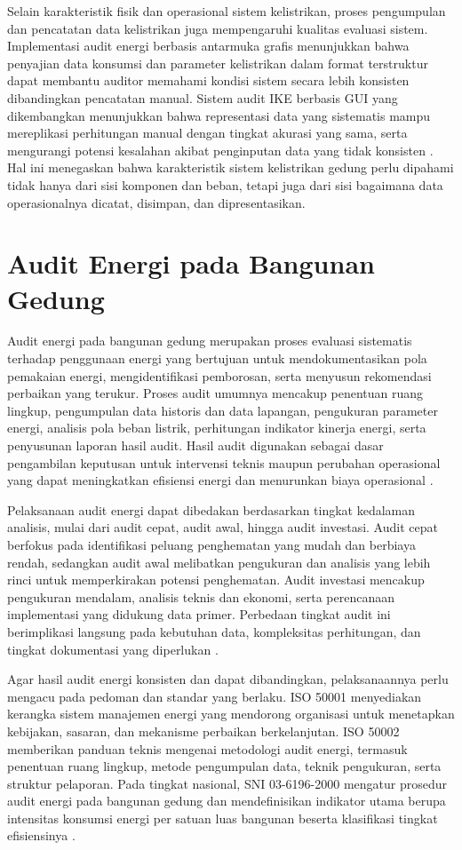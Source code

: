 Selain karakteristik fisik dan operasional sistem kelistrikan, proses pengumpulan dan pencatatan data kelistrikan juga mempengaruhi kualitas evaluasi sistem. Implementasi audit energi berbasis antarmuka grafis menunjukkan bahwa penyajian data konsumsi dan parameter kelistrikan dalam format terstruktur dapat membantu auditor memahami kondisi sistem secara lebih konsisten dibandingkan pencatatan manual. Sistem audit IKE berbasis GUI yang dikembangkan menunjukkan bahwa representasi data yang sistematis mampu mereplikasi perhitungan manual dengan tingkat akurasi yang sama, serta mengurangi potensi kesalahan akibat penginputan data yang tidak konsisten \cite{fitri2022sistem}. Hal ini menegaskan bahwa karakteristik sistem kelistrikan gedung perlu dipahami tidak hanya dari sisi komponen dan beban, tetapi juga dari sisi bagaimana data operasionalnya dicatat, disimpan, dan dipresentasikan.

\section{Audit Energi pada Bangunan Gedung}
Audit energi pada bangunan gedung merupakan proses evaluasi sistematis terhadap penggunaan energi yang bertujuan untuk mendokumentasikan pola pemakaian energi, mengidentifikasi pemborosan, serta menyusun rekomendasi perbaikan yang terukur. Proses audit umumnya mencakup penentuan ruang lingkup, pengumpulan data historis dan data lapangan, pengukuran parameter energi, analisis pola beban listrik, perhitungan indikator kinerja energi, serta penyusunan laporan hasil audit. Hasil audit digunakan sebagai dasar pengambilan keputusan untuk intervensi teknis maupun perubahan operasional yang dapat meningkatkan efisiensi energi dan menurunkan biaya operasional \cite{putra2025evaluasi}.

Pelaksanaan audit energi dapat dibedakan berdasarkan tingkat kedalaman analisis, mulai dari audit cepat, audit awal, hingga audit investasi. Audit cepat berfokus pada identifikasi peluang penghematan yang mudah dan berbiaya rendah, sedangkan audit awal melibatkan pengukuran dan analisis yang lebih rinci untuk memperkirakan potensi penghematan. Audit investasi mencakup pengukuran mendalam, analisis teknis dan ekonomi, serta perencanaan implementasi yang didukung data primer. Perbedaan tingkat audit ini berimplikasi langsung pada kebutuhan data, kompleksitas perhitungan, dan tingkat dokumentasi yang diperlukan \cite{putra2025evaluasi}.

Agar hasil audit energi konsisten dan dapat dibandingkan, pelaksanaannya perlu mengacu pada pedoman dan standar yang berlaku. ISO 50001 menyediakan kerangka sistem manajemen energi yang mendorong organisasi untuk menetapkan kebijakan, sasaran, dan mekanisme perbaikan berkelanjutan. ISO 50002 memberikan panduan teknis mengenai metodologi audit energi, termasuk penentuan ruang lingkup, metode pengumpulan data, teknik pengukuran, serta struktur pelaporan. Pada tingkat nasional, SNI 03-6196-2000 mengatur prosedur audit energi pada bangunan gedung dan mendefinisikan indikator utama berupa intensitas konsumsi energi per satuan luas bangunan beserta klasifikasi tingkat efisiensinya \cite{iso2018_50001,iso2014_50002,sni2000_036196}.

